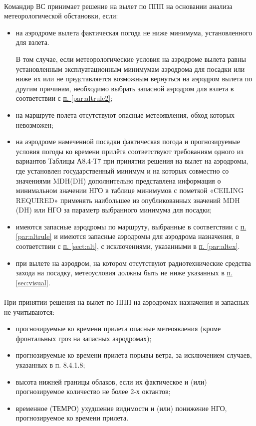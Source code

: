 \paragraph{}Командир ВС принимает решение на вылет по ППП на основании анализа метеорологической обстановки, если:
\begin{itemize}
    \item на аэродроме вылета фактическая погода не ниже минимума, установленного для взлета.
    
    В том случае, если метеорологические условия на аэродроме вылета равны установленным эксплуатационным минимумам аэродрома для посадки или ниже их или не представляется возможным вернуться на аэродром вылета по другим причинам, необходимо выбрать запасной аэродром для взлета в соответствии с \hyperref[par:altrule2]{п. \ref*{par:altrule2}}; 
    \item на маршруте полета отсутствуют опасные метеоявления, обход которых невозможен;
    \item на аэродроме намеченной посадки фактическая погода и прогнозируемые условия погоды ко времени прилёта соответствуют требованиям одного из вариантов Таблицы А8.4-Т7 при принятии решения на вылет на аэродромы, где установлен государственный минимум и на которых совместно со значениями MDH(DH) дополнительно представлена информация о минимальном значении НГО в таблице минимумов с пометкой «CEILING REQUIRED» применять наибольшее из опубликованных значений MDH (DH) или НГО за параметр выбранного минимума для посадки;
    \item имеются запасные аэродромы по маршруту, выбранные в соответствии с \hyperref[par:altrule]{п. \ref*{par:altrule}}  и имеются запасные аэродромы для аэродрома назначения, в соответствии с \hyperref[sect:alt]{п. \ref*{sect:alt}}, с исключениями, указанными в \hyperref[par:altex]{п. \ref*{par:altex}}. 
    \item при вылете на аэродром, на котором отсутствуют радиотехнические средства захода на посадку, метеоусловия должны быть не ниже указанных в \hyperref[sec:visual]{п. \ref*{sec:visual}}.
\end{itemize}


\paragraph{} При принятии решения на вылет по ППП на аэродромах назначения и запасных не учитываются:
\begin{itemize}
    \item прогнозируемые ко времени прилета опасные метеоявления (кроме фронтальных гроз на запасных аэродромах);
    \item прогнозируемые ко времени прилета порывы ветра, за исключением случаев, указанных в п. 8.4.1.8;
    \item высота нижней границы облаков, если их фактическое и (или) прогнозируемое количество не более 2-х октантов;
    \item временное (ТЕМРО) ухудшение видимости и (или) понижение НГО, прогнозируемое ко времени прилета.
\end{itemize}	

